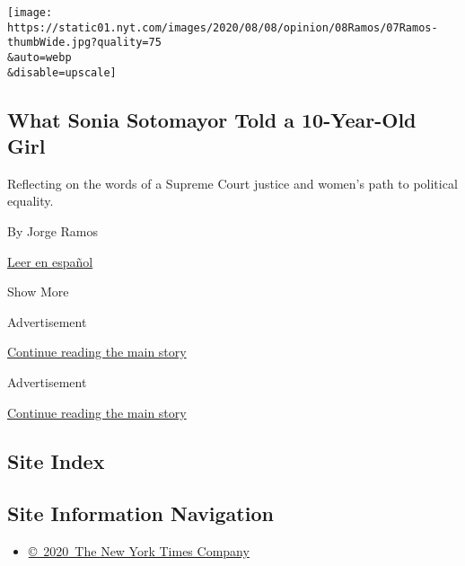 \begin{enumerate}
  \texttt{[image: https://static01.nyt.com/images/2020/08/08/opinion/08Ramos/07Ramos-thumbWide.jpg?quality=75\\\&auto=webp\\\&disable=upscale]}

  \hypertarget{what-sonia-sotomayor-told-a-10-year-old-girl}{%
  \subsection{What Sonia Sotomayor Told a 10-Year-Old
  Girl}\label{what-sonia-sotomayor-told-a-10-year-old-girl}}

  Reflecting on the words of a Supreme Court justice and women's path to
  political equality.

  By Jorge Ramos

  \href{https://www.nytimes.com/es/2020/08/07/espanol/opinion/presidenta-estados-unidos.html}{Leer
  en español}
\end{enumerate}

Show More

Advertisement

\protect\hyperlink{after-mid1}{Continue reading the main story}

Advertisement

\protect\hyperlink{after-mktg}{Continue reading the main story}

\hypertarget{site-index}{%
\subsection{Site Index}\label{site-index}}

\hypertarget{site-information-navigation}{%
\subsection{Site Information
Navigation}\label{site-information-navigation}}

\begin{itemize}
\tightlist
\item
  \href{https://help.nytimes.com/hc/en-us/articles/115014792127-Copyright-notice}{©~2020~The
  New York Times Company}
\end{itemize}

